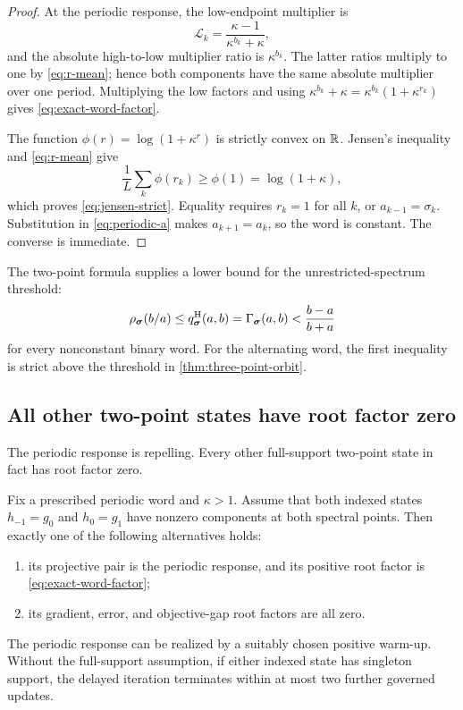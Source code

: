 \documentclass[letterpaper,twoside]{article}
\begin{document}
\begin{proof}
At the periodic response, the low-endpoint multiplier is
\[
 \mathcal L_k=\frac{\kappa-1}{\kappa^{b_k}+\kappa},
\]
and the absolute high-to-low multiplier ratio is $\kappa^{b_k}$.  The latter
ratios multiply to one by \eqref{eq:r-mean}; hence both components have the
same absolute multiplier over one period.  Multiplying the low factors and
using
$\kappa^{b_k}+\kappa=\kappa^{b_k}(1+\kappa^{r_k})$ gives
\eqref{eq:exact-word-factor}.

The function $\phi(r)=\log(1+\kappa^r)$ is strictly convex on $\mathbb R$.  Jensen's
inequality and \eqref{eq:r-mean} give
\[
 \frac1L\sum_k\phi(r_k)\ge\phi(1)=\log(1+\kappa),
\]
which proves \eqref{eq:jensen-strict}.  Equality requires $r_k=1$ for all
$k$, or $a_{k-1}=\sigma_k$.  Substitution in \eqref{eq:periodic-a} makes
$a_{k+1}=a_k$, so the word is constant.  The converse is immediate.
\end{proof}

The two-point formula supplies a lower bound for the unrestricted-spectrum
threshold:
\begin{equation}\label{eq:rho-lower-gamma}
 \rho_{\bm\sigma}(b/a)
 \le q^{\rm H}_{\bm\sigma}(a,b)
 =\Gamma_{\bm\sigma}(a,b)
 <\frac{b-a}{b+a}
\end{equation}
for every nonconstant binary word.  For the alternating word, the first
inequality is strict above the threshold in \cref{thm:three-point-orbit}.

\subsection{All other two-point states have root factor zero}

The periodic response is repelling.  Every other full-support two-point state
in fact has root factor zero.

\begin{theorem}\label{thm:two-point-dichotomy}
Fix a prescribed periodic word and $\kappa>1$.  Assume that both indexed
states $h_{-1}=g_0$ and $h_0=g_1$ have nonzero components at both spectral
points.  Then exactly one of the following alternatives holds:
\begin{enumerate}[label=(\alph*)]
\item its projective pair is the periodic response, and its positive root
factor is \eqref{eq:exact-word-factor};
\item its gradient, error, and objective-gap root factors are all zero.
\end{enumerate}
The periodic response can be realized by a suitably chosen positive warm-up.
Without the full-support assumption, if either indexed state has singleton
support, the delayed iteration
terminates within at most two further governed updates.
\end{theorem}
\end{document}
